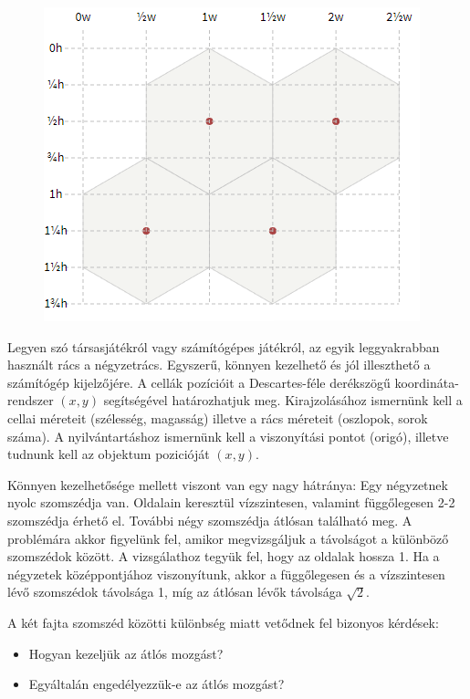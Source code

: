\begin{figure}[h]
\centering
\includegraphics[scale=0.7]{kepek/image8.png}
\caption{}
\label{fig:image8}
\end{figure}

Legyen szó társasjátékról vagy számítógépes játékról, az egyik leggyakrabban használt rács a négyzetrács. Egyszerű, könnyen kezelhető és jól illeszthető a számítógép kijelzőjére. A cellák pozícióit a Descartes-féle derékszögű koordináta-rendszer $(x, y)$ segítségével határozhatjuk meg. Kirajzolásához ismernünk kell a cellai méreteit (szélesség, magasság) illetve a rács méreteit (oszlopok, sorok száma). A nyilvántartáshoz ismernünk kell a viszonyítási pontot (origó), illetve tudnunk kell az objektum pozicióját $(x, y)$.

Könnyen kezelhetősége mellett viszont van egy nagy hátránya:
Egy négyzetnek nyolc szomszédja van. Oldalain keresztül vízszintesen, valamint függőlegesen 2-2 szomszédja érhető el. További négy szomszédja átlósan található meg. A problémára akkor figyelünk fel, amikor megvizsgáljuk a távolságot a különböző szomszédok között. A vizsgálathoz tegyük fel, hogy az oldalak hossza 1. Ha a négyzetek középpontjához viszonyítunk, akkor a függőlegesen és a vízszintesen lévő szomszédok távolsága 1, míg az átlósan lévők távolsága $\sqrt{2}$.

A két fajta szomszéd közötti különbség miatt vetődnek fel bizonyos kérdések:
\begin{itemize}
\item Hogyan kezeljük az átlós mozgást? 
\item Egyáltalán engedélyezzük-e az átlós mozgást? 
\end{itemize}

